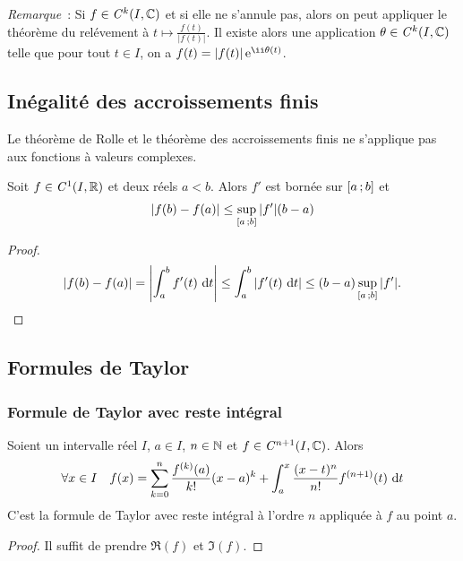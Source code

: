 \emph{Remarque}~: Si $f \in \mathit{C}^k(I,\mathbb{C})$ et si elle ne s'annule pas, alors on peut appliquer le théorème du relévement à $t \longmapsto \frac{f(t)}{|f(t)|}$. Il existe alors une application $\theta \in \mathit{C}^k(I,\mathbb{C})$ telle que pour tout $t \in I$, on a $f(t) = |f(t)|\e^{\ii \theta(t)}$.

\subsection{Inégalité des accroissements finis}

\danger Le théorème de Rolle et le théorème des accroissements finis ne s'applique pas aux fonctions à valeurs complexes.

\begin{prop}
  Soit $f \in \mathit{C}^1(I,\mathbb{R})$ et deux réels $a<b$. Alors $f'$ est bornée sur $\left[ a \, ;  b \right]$ et
  \begin{equation}
    |f(b)-f(a)| \leq \sup\limits_{\left[ a \, ;  b \right]}|f'|(b-a)
  \end{equation}
\end{prop}
\begin{proof}
  \begin{equation}
    |f(b)-f(a)| = \left|\int_a^b f'(t)\,\mathop{}\mathopen{}\mathrm{d} t\right| \leq \int_a^b |f'(t)\,\mathop{}\mathopen{}\mathrm{d} t| \leq (b-a) \sup\limits_{\left[ a \, ;  b \right]}|f'|.
  \end{equation}
\end{proof}

\subsection{Formules de Taylor}

\subsubsection{Formule de Taylor avec reste intégral}

\begin{theo}
  Soient un intervalle réel $I$, $a \in I$, $n \in \mathbb{N}$ et $f \in \mathit{C}^{n+1}(I,\mathbb{C})$. Alors
  \begin{equation}
    \forall x \in I \quad f(x) = \sum_{k=0}^n \frac{f^{(k)}(a)}{k!}(x-a)^k + \int_a^x \frac{(x-t)^n}{n!} f^{(n+1)}(t)\,\mathop{}\mathopen{}\mathrm{d} t
  \end{equation}
  C'est la formule de Taylor avec reste intégral à l'ordre $n$ appliquée à $f$ au point $a$.
\end{theo}
\begin{proof}
  Il suffit de prendre $\Re(f)$ et $\Im(f)$.
\end{proof}

